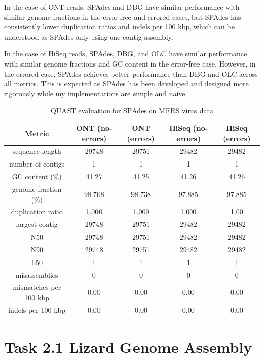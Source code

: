 \documentclass[12pt]{article}
\begin{document}
In the case of ONT reads, SPAdes and DBG have similar performance with similar genome fractions in the error-free and errored cases, but SPAdes has consistently lower duplication ratios and indels per 100 kbp, which can be understood as SPAdes only using one contig assembly.

In the case of HiSeq reads, SPAdes, DBG, and OLC have similar performance with similar genome fractions and GC content in the error-free case. However, in the errored case, SPAdes achieves better performance than DBG and OLC across all metrics.
This is expected as SPAdes has been developed and designed more rigorously while my implementations are simple and naive.

\begin{table}[h!]
\begin{center}
\begin{tabular}{ |c|c|c|c|c| }
    \hline
    Metric & ONT (no-errors) & ONT (errors) & HiSeq (no-errors) & HiSeq (errors) \\
    \hline
    sequence length & 29748 & 29751 & 29482 & 29482 \\
    number of contigs & 1 & 1 & 1 & 1 \\
    GC content (\%) & 41.27 & 41.25 & 41.26 & 41.26  \\
    genome fraction (\%) & 98.768 & 98.738 & 97.885  & 97.885 \\
    duplication ratio & 1.000 & 1.000 & 1.000 & 1.00 \\
    largest contig & 29748 & 29751 & 29482 & 29482 \\
    N50 & 29748 & 29751 & 29482 & 29482 \\
    N90 & 29748 & 29751 & 29482 & 29482 \\
    L50 & 1 & 1 & 1 & 1 \\
    misassemblies & 0 & 0 & 0 & 0 \\
    mismatches per 100 kbp & 0.00 & 0.00 & 0.00 & 0.00 \\
    indels per 100 kbp & 0.00 & 0.00 & 0.00 & 0.00 \\
    \hline
\end{tabular}
\end{center}
\caption{QUAST evaluation for SPAdes on MERS virus data}
\label{tab:quast_mers_spades}
\end{table}

\section{Task 2.1 Lizard Genome Assembly}
\end{document}
